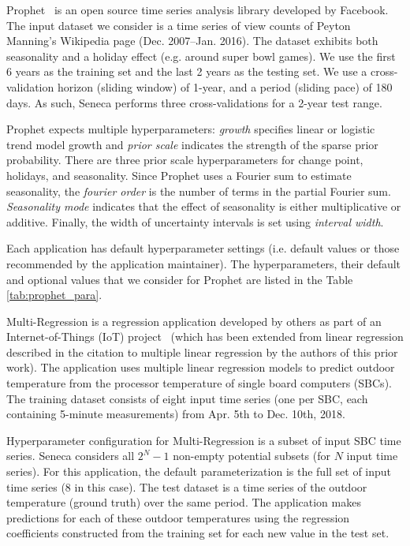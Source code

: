 Prophet~\cite{ref:prophet} is an open source time series analysis library developed
by Facebook.  The input dataset we consider is a time series of view counts
of Peyton Manning's Wikipedia page (Dec. 2007--Jan. 2016).
The dataset exhibits both seasonality and a holiday effect (e.g. around 
super bowl games).  We use the first 6 years as the training set 
and the last 2 years as the testing set.  We use a cross-validation 
horizon (sliding window) of 1-year, and a period (sliding pace) 
of 180 days.  As such, Seneca performs three cross-validations for a 2-year test range.

Prophet expects multiple hyperparameters: \textit{growth} specifies linear or logistic trend model growth and \textit{prior scale} indicates the strength of the sparse prior probability. There are three prior scale hyperparameters for change point, holidays, and seasonality. Since Prophet uses a Fourier sum to estimate seasonality, the \textit{fourier order} is the number of terms in the partial Fourier sum. \textit{Seasonality mode} indicates that the effect of seasonality is either multiplicative or additive. Finally, the width of uncertainty intervals is set using \textit{interval width}.

Each application has default hyperparameter settings (i.e. default values or those recommended by the application maintainer). The hyperparameters, their default and optional values that we consider for Prophet are listed in the Table \ref{tab:prophet_para}.

Multi-Regression is a regression application developed by others as part of
an Internet-of-Things (IoT) project~\cite{iot-cpu} (which has been
extended from linear regression described in the citation 
to multiple linear regression by the authors of this prior work).
The application uses multiple linear regression models
to predict outdoor temperature from the processor 
temperature of single board computers (SBCs).  
The training dataset consists of eight input time 
series (one per SBC, each containing 
5-minute measurements) from Apr. 5th to Dec. 10th, 2018.

Hyperparameter configuration for Multi-Regression is a subset of input SBC time series.
Seneca considers all \texttt{$2^N - 1$} non-empty potential subsets (for $N$ input time series).
For this application, the default parameterization is the 
full set of input time series (8 in this case).
The test dataset is a time 
series of the outdoor temperature (ground truth) 
over the same period.  
The application makes 
predictions for each of these outdoor temperatures
using the regression coefficients constructed from the training set
for each new value in the test set.

